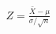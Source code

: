 \documentclass[preview]{standalone}
\begin{document}
\begin{align*}
Z = \frac{\bar{X} - \mu}{\sigma / \sqrt{n}}
\end{align*}
\end{document}
